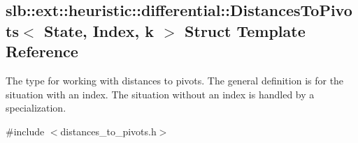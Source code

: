 \hypertarget{structslb_1_1ext_1_1heuristic_1_1differential_1_1DistancesToPivots}{}\subsection{slb\+:\+:ext\+:\+:heuristic\+:\+:differential\+:\+:Distances\+To\+Pivots$<$ State, Index, k $>$ Struct Template Reference}
\label{structslb_1_1ext_1_1heuristic_1_1differential_1_1DistancesToPivots}


The type for working with distances to pivots. The general definition is for the situation with an index. The situation without an index is handled by a specialization.  




{\ttfamily \#include $<$distances\+\_\+to\+\_\+pivots.\+h$>$}

